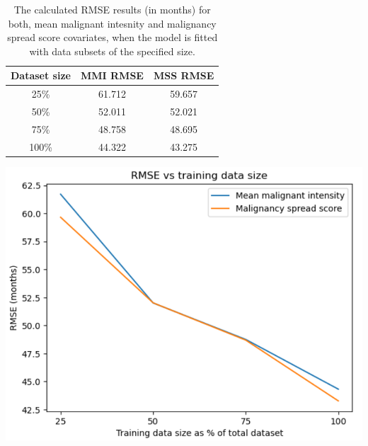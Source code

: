 \documentclass{l4proj}
\begin{document}
\begin{table}[ht]
\hspace{-1cm}
\begin{minipage}[b]{0.56\linewidth}
\centering
\begin{tabular}{c|c|c}
    \hline
         Dataset size & MMI RMSE & MSS RMSE  \\ \hline
         25\% & 61.712 & 59.657\\
         50\% & 52.011 & 52.021\\
         75\% & 48.758 & 48.695\\
         100\% & 44.322 & 43.275\\
    \end{tabular}
    \vspace{2cm}
    \caption{The calculated RMSE results (in months) for both, mean malignant intesnity and malignancy spread score covariates, when the model is fitted with data subsets of the specified size.}
    \label{tab:datset-size-effect}
\end{minipage}\hfill
\hspace{-2cm}
\begin{minipage}[b]{0.4\linewidth}
\centering
    \includegraphics[scale=0.3]{images/data-size-RMSE.png}
    \label{fig:data-size-RMSE}
\end{minipage}
\end{table}
\end{document}
